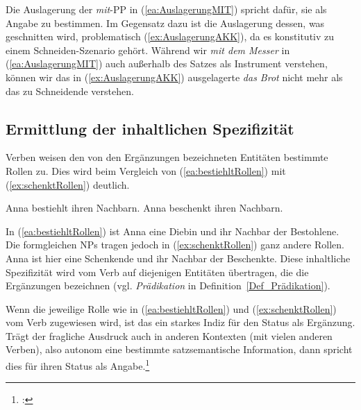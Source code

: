 \ea 
{}\label{ea:AuslagerungMIT}
\label{ex:AuslagerungAKK}
\z 
\z 

Die Auslagerung der \textit{mit}-PP in (\ref{ea:AuslagerungMIT}) spricht dafür, sie als Angabe zu bestimmen. Im Gegensatz dazu ist die Auslagerung dessen, was geschnitten wird, problematisch (\ref{ex:AuslagerungAKK}), da es konstitutiv zu einem Schneiden-Szenario gehört. Während wir \textit{mit dem Messer} in (\ref{ea:AuslagerungMIT}) auch außerhalb des Satzes als Instrument verstehen, können wir das in (\ref{ex:AuslagerungAKK}) ausgelagerte \textit{das Brot} nicht mehr als das zu Schneidende verstehen.  


\subsection{Ermittlung der inhaltlichen Spezifizität}\label{subsubsection:TestINSP} 

Verben weisen den von den Ergänzungen bezeichneten Entitäten bestimmte Rollen zu. Dies wird beim Vergleich von (\ref{ea:bestiehltRollen}) mit (\ref{ex:schenktRollen}) deutlich.

\ea 
\ea \label{ea:bestiehltRollen} Anna bestiehlt ihren Nachbarn.
\ex \label{ex:schenktRollen} Anna beschenkt ihren Nachbarn.
\z 
\z 

In (\ref{ea:bestiehltRollen}) ist Anna eine Diebin und ihr Nachbar der Bestohlene. Die formgleichen NPs tragen jedoch in (\ref{ex:schenktRollen}) ganz andere Rollen. Anna ist hier eine Schenkende und ihr Nachbar der Beschenkte. Diese inhaltliche Spezifizität wird vom Verb auf diejenigen Entitäten übertragen, die die Ergänzungen bezeichnen (vgl. \textit{Prädikation} in Definition~\ref{Def_Prädikation}). 

Wenn die jeweilige Rolle wie in (\ref{ea:bestiehltRollen}) und (\ref{ex:schenktRollen}) vom Verb zugewiesen wird, ist das ein starkes Indiz für den Status als Ergänzung. Trägt der fragliche Ausdruck auch in anderen Kontexten (mit vielen anderen Verben), also autonom eine bestimmte satzsemantische Information, dann spricht dies für ihren Status als Angabe.\footnote{\citet[1039--1040]{ZifHoffStr1997}: }
 
